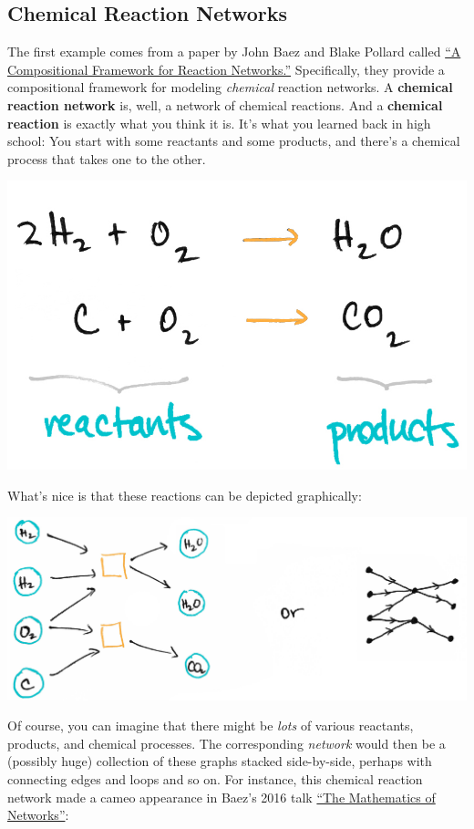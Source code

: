 \documentclass{tufte-handout-tai}
\theoremstyle{plain}
\theoremstyle{definition}
\theoremstyle{remark}
\begin{document}
\subsection{Chemical Reaction Networks}\label{sec:First}
The first example comes from a paper by John Baez and Blake Pollard called \href{https://arxiv.org/abs/1704.02051}{``A Compositional Framework for Reaction Networks.''} Specifically, they provide a compositional framework for modeling \textit{chemical} reaction networks. A \textbf{chemical reaction network} is, well, a network of chemical reactions. And a \textbf{chemical reaction} is exactly what you think it is. It's what you learned back in high school: You start with some \textcolor{BlueGreen}{reactants} and some \textcolor{BlueGreen}{products}, and there's a \textcolor{BurntOrange}{chemical} process that takes one to the other.
\begin{center}
\includegraphics[width=!,totalheight=!,scale=0.2]{chem.jpg}
\end{center}
What's nice is that these reactions can be depicted graphically:
\begin{center}
\includegraphics[width=!,totalheight=!,scale=0.1]{chem2.jpg}
\end{center}
Of course, you can imagine that there might be \textit{lots} of various \textcolor{BlueGreen}{reactants, products}, and \textcolor{BurntOrange}{chemical processes}. The corresponding \textit{network} would then be a (possibly huge) collection of these graphs stacked side-by-side, perhaps with connecting edges and loops and so on. For instance, this chemical reaction network made a cameo appearance in Baez's 2016 talk \href{https://www.youtube.com/watch?v=IyJP_7ucwWo}{``The Mathematics of Networks''}:
\end{document}
